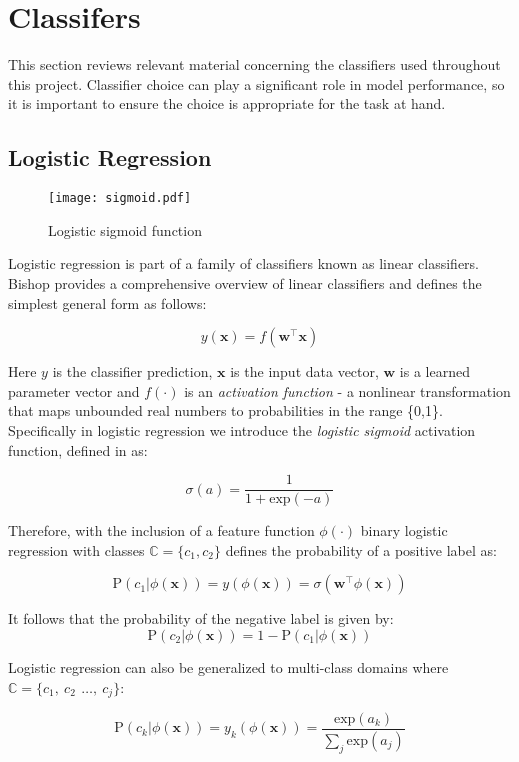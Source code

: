 \documentclass[Dissertation.tex]{subfiles}
\begin{document}
\section{Classifers}
This section reviews relevant material concerning the classifiers used throughout this project. Classifier choice can play a significant role in model performance, so it is important to ensure the choice is appropriate for the task at hand.
\subsection{Logistic Regression}

\begin{figure}
	\centering
	\texttt{[image: sigmoid.pdf]}
	\caption{Logistic sigmoid function}
	\label{logisticFunction}
\end{figure}
Logistic regression is part of a family of classifiers known as linear classifiers.	Bishop \cite{bishopPatternRecognitionMachine2006} provides a comprehensive overview of linear classifiers and defines the simplest general form as follows:

$$ 
 y(\mathbf{x}) = f(\mathbf{w}^\top\mathbf{x}) 
$$

Here $ y $ is the classifier prediction, $ \mathbf{x} $ is the input data vector, $ \mathbf{w} $ is a learned parameter vector and $ f(\cdot) $ is an \textit{activation function} - a nonlinear transformation that maps unbounded real numbers to probabilities in the range \{0,1\}. Specifically in logistic regression we introduce the \textit{logistic sigmoid} activation function, defined in  \cite{bishopPatternRecognitionMachine2006} as:

\[ \sigma(a) = \frac{1}{1 + \mathrm{exp}(-a)} \]

Therefore, with the inclusion of a feature function $ \phi(\cdot) $ binary logistic regression with classes $ \mathbb{C} = \{c_1, c_2\} $ \cite{bishopPatternRecognitionMachine2006} defines the probability of a positive label as:

\[ \mathrm{P}(c_1|\phi(\mathbf{x})) = y(\phi(\mathbf{x})) =  \sigma(\mathbf{w}^\top\phi(\mathbf{x}
)) \]

It follows that the probability of the negative label is given by: $$ \mathrm{P}(c_2| \phi(\mathbf{x})) = 1-\mathrm{P}(c_1|\phi(\mathbf{x})) $$

Logistic regression can also be generalized to multi-class domains where $ \mathbb{C} = \{c_1,\ c_2\, \ \dots,\ c_j \} $:

\[ \mathrm{P}(c_k|\phi(\mathbf{x})) = y_k(\phi(\mathbf{x})) =  \frac{\mathrm{exp}(a_k)}{\sum_{j}\mathrm{exp}(a_j)}   \]
\end{document}
